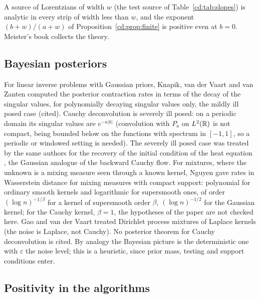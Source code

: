 A source of Lorentzians of width $w$ (the test source of Table~\ref{cd:tab:slopes}) is analytic in every strip of width less than $w$, and the exponent $(b+w)/(a+w)$ of Proposition~\ref{cd:prop:finite} is positive even at $b=0$. Meister's book \cite{Meister09} collects the theory.

\subsection{Bayesian posteriors}\label{cd:sec:bayes}

For linear inverse problems with Gaussian priors, Knapik, van der Vaart and van Zanten \cite{KnapikVZ11} computed the posterior contraction rates in terms of the decay of the singular values, for polynomially decaying singular values only, the mildly ill posed case (cited). Cauchy deconvolution is severely ill posed: on a periodic domain its singular values are $e^{-a\lvert k\rvert}$ (convolution with $P_a$ on $L^2(\mathbb{R})$ is not compact, being bounded below on the functions with spectrum in $[-1,1]$, so a periodic or windowed setting is needed). The severely ill posed case was treated by the same authors for the recovery of the initial condition of the heat equation \cite{KnapikVZ13}, the Gaussian analogue of the backward Cauchy flow. For mixtures, where the unknown is a mixing measure seen through a known kernel, Nguyen \cite{Nguyen13} gave rates in Wasserstein distance for mixing measures with compact support: polynomial for ordinary smooth kernels and logarithmic for supersmooth ones, of order $(\log n)^{-1/\beta}$ for a kernel of supersmooth order $\beta$, $(\log n)^{-1/2}$ for the Gaussian kernel; for the Cauchy kernel, $\beta=1$, the hypotheses of the paper are not checked here. Gao and van der Vaart \cite{GaoVdV16} treated Dirichlet process mixtures of Laplace kernels (the noise is Laplace, not Cauchy). No posterior theorem for Cauchy deconvolution is cited. By analogy the Bayesian picture is the deterministic one with $\varepsilon$ the noise level; this is a heuristic, since prior mass, testing and support conditions enter.

\subsection{Positivity in the algorithms}

